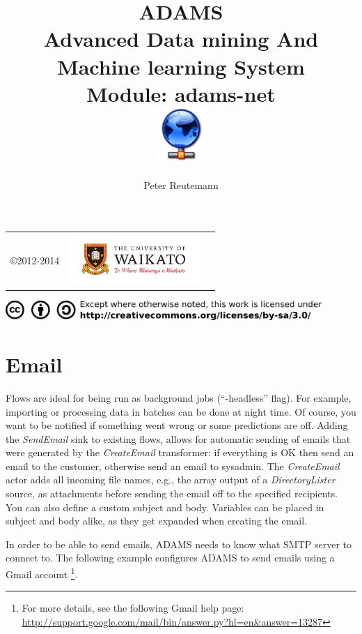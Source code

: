 \documentclass[a4paper]{book}
\title{
  \textbf{ADAMS} \\
  {\Large \textbf{A}dvanced \textbf{D}ata mining \textbf{A}nd \textbf{M}achine
  learning \textbf{S}ystem} \\
  {\Large Module: adams-net} \\
  \vspace{1cm}
  \includegraphics[width=2cm]{images/net-module.png} \\
}
\author{
  Peter Reutemann
}
\begin{document}
\begin{titlepage}
\maketitle

\thispagestyle{empty}
\center
\begin{table}[b]
	\begin{tabular}{c l l}
		\parbox[c][2cm]{2cm}{\copyright 2012-2014} &
		\parbox[c][2cm]{5cm}{\includegraphics[width=5cm]{images/coat_of_arms.pdf}} \\
	\end{tabular}
	\includegraphics[width=12cm]{images/cc.png} \\
\end{table}

\end{titlepage}

\tableofcontents
\listoffigures


\chapter{Email}
Flows are ideal for being run as background jobs (``-headless'' flag). For
example, importing or processing data in batches can be done at night time. 
Of course, you want to be notified if something went wrong or some predictions
are off. Adding the \textit{SendEmail} sink to existing flows, allows for automatic
sending of emails that were generated by the \textit{CreateEmail} transformer: 
if everything is OK then send an email to the customer,
otherwise send an email to sysadmin. The \textit{CreateEmail} actor adds all incoming
file names, e.g., the array output of a \textit{DirectoryLister} source, as
attachments before sending the email off to the specified recipients. You can
also define a custom subject and body. Variables can be placed in subject and
body alike, as they get expanded when creating the email.

In order to be able to send emails, ADAMS needs to know what SMTP server to
connect to. The following example configures ADAMS to send emails using a Gmail
account \footnote{For more details, see the following Gmail help page: \\
\url{http://support.google.com/mail/bin/answer.py?hl=en&answer=13287}{}}. 
\end{document}
